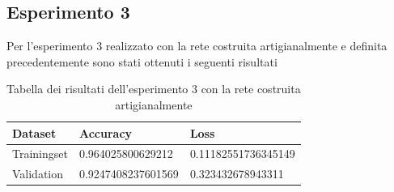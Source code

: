 \subsection{Esperimento 3}

Per l'esperimento 3 realizzato con la rete costruita artigianalmente e definita precedentemente sono stati ottenuti i seguenti risultati

\begin{table}[H]
    \begin{tabular}{|l|l|l|}
    \hline
    \textbf{Dataset}     & \textbf{Accuracy}           & \textbf{Loss}                 \\ \hline
    Trainingset & 0.964025800629212 & 0.11182551736345149 \\ \hline
    Validation  & 0.9247408237601569 & 0.323432678943311  \\ \hline
    \end{tabular}
   	\caption{\label{tab:esperimento3_risultati}Tabella dei risultati dell'esperimento 3 con la rete costruita artigianalmente}
\end{table}

